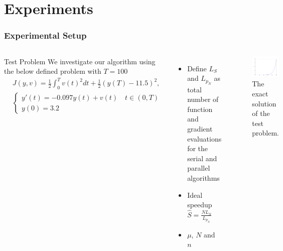 \documentclass[9pt]{beamer}
\begin{document}
\section{Experiments}
\begin{frame}
\frametitle{Experimental Setup}
\begin{columns}
\begin{block}{Test Problem}
We investigate our algorithm using the below defined problem with $T=100$
{\small\begin{align*}
&J(y,v) = \frac{1}{2}\int_0^{T}v(t)^2dt + \frac{1}{2}(y(T)-11.5)^2, \\
&\left\{
     \begin{array}{lr}
       	y'(t)=-0.097y(t) + v(t) \quad t\in(0,T)\\
       	y(0)=3.2
     \end{array}
   \right. 
\end{align*}}
\end{block}
\begin{itemize}
\item<1->{Define $L_S$ and $L_{p_N}$ as total number of function and gradient evaluations for the serial and parallel algorithms}
\item<1->{Ideal speedup $\hat{S}=\frac{N L_S}{L_{p_N}}$}
\item<1->{$\mu$, $N$ and $n$}
\end{itemize}
\begin{figure}
\includegraphics[scale=0.25]{exact.png}
\caption{The exact solution of the test problem.}
\end{figure}
\end{columns}
\end{frame}
\end{document}
